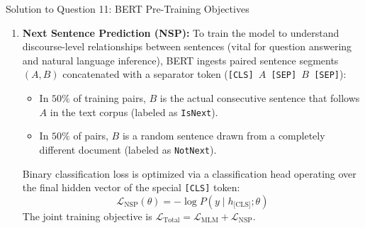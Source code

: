 \documentclass[11pt,a4paper]{article}
\begin{document}
\begin{solutionbox}{Solution to Question 11: BERT Pre-Training Objectives}
\begin{enumerate}[label=\arabic*.,leftmargin=2em]
    \item \textbf{Next Sentence Prediction (NSP):}
    To train the model to understand discourse-level relationships between sentences (vital for question answering and natural language inference), BERT ingests paired sentence segments $(A, B)$ concatenated with a separator token (\texttt{[CLS] $A$ [SEP] $B$ [SEP]}):
    \begin{itemize}
        \item In $50\%$ of training pairs, $B$ is the actual consecutive sentence that follows $A$ in the text corpus (labeled as \texttt{IsNext}).
        \item In $50\%$ of pairs, $B$ is a random sentence drawn from a completely different document (labeled as \texttt{NotNext}).
    \end{itemize}
    Binary classification loss is optimized via a classification head operating over the final hidden vector of the special \texttt{[CLS]} token:
    \begin{equation}
        \mathcal{L}_{\text{NSP}}(\theta) = -\log P(y \mid h_{\text{[CLS]}}; \theta)
    \end{equation}
    The joint training objective is $\mathcal{L}_{\text{Total}} = \mathcal{L}_{\text{MLM}} + \mathcal{L}_{\text{NSP}}$.
\end{enumerate}


\end{solutionbox}
\end{document}
